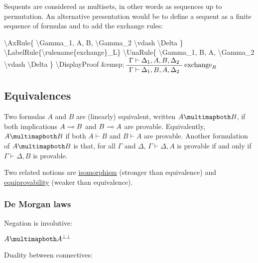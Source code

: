 Sequents are considered as multisets, in other words as sequences up to
permutation. An alternative presentation would be to define a sequent as
a finite sequence of formulas and to add the exchange rules:

\begin{description}
\tightlist
\item[]
\end{description}

\textbackslash{}AxRule\{ \textbackslash{}Gamma\_1, A, B,
\textbackslash{}Gamma\_2 \textbackslash{}vdash \textbackslash{}Delta \}
\textbackslash{}LabelRule\{\textbackslash{}rulename\{exchange\}\_L\}
\textbackslash{}UnaRule\{ \textbackslash{}Gamma\_1, B, A,
\textbackslash{}Gamma\_2 \textbackslash{}vdash \textbackslash{}Delta \}
\textbackslash{}DisplayProof \&emsp;
\(\AxRule{ \Gamma \vdash \Delta_1, A, B, \Delta_2 }
\LabelRule{\rulename{exchange}_R}
\UnaRule{ \Gamma \vdash \Delta_1, B, A, \Delta_2 }
\DisplayProof\)

\subsection{Equivalences}\label{equivalences}

Two formulas \(A\) and \(B\) are (linearly) equivalent, written
\(A\linequiv B\), if both implications \(A\multimap B\) and \(B\multimap A\) are
provable. Equivalently, \(A\linequiv B\) if both \(A\vdash B\) and
\(B\vdash A\) are provable. Another formulation of \(A\linequiv B\) is
that, for all \(\Gamma\) and \(\Delta\), \(\Gamma\vdash\Delta,A\) is
provable if and only if \(\Gamma\vdash\Delta,B\) is provable.

Two related notions are \url{isomorphism} (stronger than equivalence)
and \url{equiprovability} (weaker than equivalence).

\subsubsection{De Morgan laws}\label{de-morgan-laws}

Negation is involutive:

\begin{description}
\tightlist
\item[]
\(A\linequiv A\biorth\)
\end{description}

Duality between connectives:

